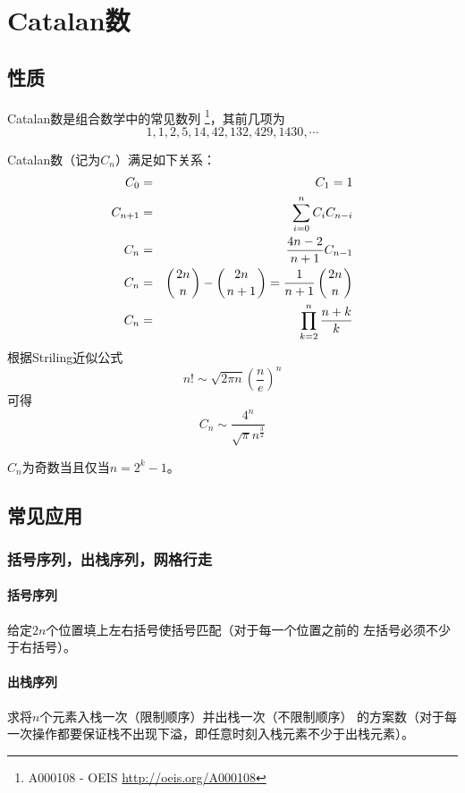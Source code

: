 \section{Catalan数}
\subsection{性质}
Catalan数是组合数学中的常见数列
\footnote{A000108 - OEIS \url{http://oeis.org/A000108}}，其前几项为
\begin{displaymath}
	1, 1, 2, 5, 14, 42, 132, 429, 1430, \cdots
\end{displaymath}

Catalan数（记为$C_n$）满足如下关系：
\begin{eqnarray}
	C_0&=&C_1=1\\
	C_{n+1}&=&\sum_{i=0}^n{C_iC_{n-i}}\label{CT2}\\
	C_n&=&\frac{4n-2}{n+1}C_{n-1}\\
	C_n&=&\left(2n \atop n\right)-\left(2n \atop n+1\right)=\frac{1}{n+1}\left(2n \atop n\right)\\
	C_n&=&\prod_{k=2}^n\frac{n+k}{k}
\end{eqnarray}
根据Striling近似公式
\begin{displaymath}
	n!\sim\sqrt{2\pi n}\left(\frac{n}{e}\right)^n
\end{displaymath}
可得
\begin{displaymath}
	C_n\sim\frac{4^n}{\sqrt{\pi} n^\frac{3}{2}}
\end{displaymath}

\begin{theorem}
	$C_n$为奇数当且仅当$n=2^k-1$。
\end{theorem}
\subsection{常见应用}
\subsubsection{括号序列，出栈序列，网格行走}
\paragraph{括号序列} 给定$2n$个位置填上左右括号使括号匹配（对于每一个位置之前的
左括号必须不少于右括号）。
\paragraph{出栈序列} 求将$n$个元素入栈一次（限制顺序）并出栈一次（不限制顺序）
的方案数（对于每一次操作都要保证栈不出现下溢，即任意时刻入栈元素不少于出栈元素）。
